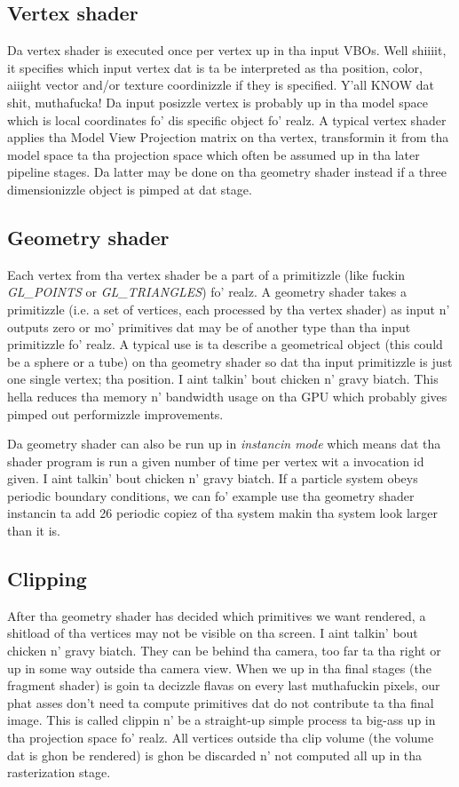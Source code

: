 \subsection{Vertex shader}
Da vertex shader is executed once per vertex up in tha input VBOs. Well shiiiit, it specifies which input vertex dat is ta be interpreted as tha position, color, aiiight vector and/or texture coordinizzle if they is specified. Y'all KNOW dat shit, muthafucka! Da input posizzle vertex is probably up in tha model space which is local coordinates fo' dis specific object fo' realz. A typical vertex shader applies tha Model View Projection matrix on tha vertex, transformin it from tha model space ta tha projection space which often be assumed up in tha later pipeline stages. Da latter may be done on tha geometry shader instead if a three dimensionizzle object is pimped at dat stage.

\subsection{Geometry shader}
Each vertex from tha vertex shader be a part of a primitizzle (like fuckin \textit{GL\_POINTS} or \textit{GL\_TRIANGLES}) fo' realz. A geometry shader takes a primitizzle (i.e. a set of vertices, each processed by tha vertex shader) as input n' outputs zero or mo' primitives dat may be of another type than tha input primitizzle fo' realz. A typical use is ta describe a geometrical object (this could be a sphere or a tube) on tha geometry shader so dat tha input primitizzle is just one single vertex; tha position. I aint talkin' bout chicken n' gravy biatch. This hella reduces tha memory n' bandwidth usage on tha GPU which probably gives pimped out performizzle improvements.

Da geometry shader can also be run up in \textit{instancin mode} which means dat tha shader program is run a given number of time per vertex wit a invocation id given. I aint talkin' bout chicken n' gravy biatch. If a particle system obeys periodic boundary conditions, we can fo' example use tha geometry shader instancin ta add 26 periodic copiez of tha system makin tha system look larger than it is. 

\subsection{Clipping}
After tha geometry shader has decided which primitives we want rendered, a shitload of tha vertices may not be visible on tha screen. I aint talkin' bout chicken n' gravy biatch. They can be behind tha camera, too far ta tha right or up in some way outside tha camera view. When we up in tha final stages (the fragment shader) is goin ta decizzle flavas on every last muthafuckin pixels, our phat asses don't need ta compute primitives dat do not contribute ta tha final image. This is called clippin n' be a straight-up simple process ta big-ass up in tha projection space fo' realz. All vertices outside tha clip volume (the volume dat is ghon be rendered) is ghon be discarded n' not computed all up in tha rasterization stage.
